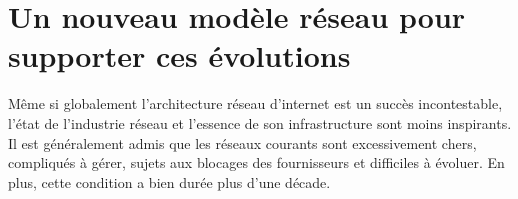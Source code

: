 \section{Un nouveau modèle réseau pour supporter ces évolutions}


Même si globalement l'architecture réseau d'internet est un succès incontestable, l'état de l'industrie réseau et l'essence de son infrastructure sont moins inspirants. Il est généralement admis que les réseaux courants sont excessivement chers, compliqués à gérer, sujets aux blocages des fournisseurs et difficiles à évoluer. En plus, cette condition a bien durée plus d'une décade. \cite{fabricIntro}




